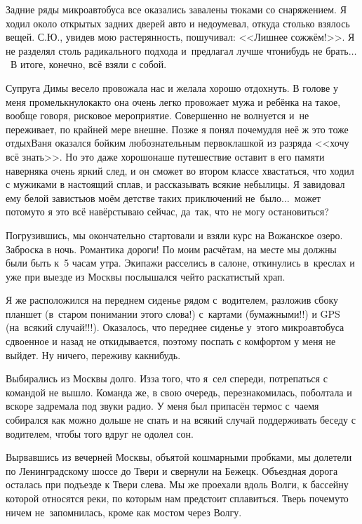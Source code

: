 Задние ряды микроавтобуса все оказались завалены тюками со снаряжением. Я ходил около открытых задних дверей авто и недоумевал, откуда столько взялось вещей. С.Ю., увидев мою растерянность, пошучивал: <<Лишнее сожжём!>>. Я не разделял столь радикального подхода и~предлагал лучше что\sdash нибудь не брать$\ldots$~В итоге, конечно, всё взяли с собой.

Супруга Димы весело провожала нас и желала хорошо отдохнуть. В голове у меня промелькнуло\mdash как\sdash то она очень легко провожает мужа и ребёнка на такое, вообще говоря, рисковое мероприятие. Совершенно не волнуется и~не переживает, по крайней мере внешне. Позже я понял почему\mdash для неё ж это тоже отдых\mdash Ваня оказался бойким любознательным первоклашкой из разряда <<хочу всё знать>>. Но это даже хорошо\mdash наше путешествие оставит в его памяти наверняка очень яркий след, и он сможет во втором классе хвастаться, что ходил с мужиками в настоящий сплав, и рассказывать всякие небылицы. Я завидовал ему белой завистью\mdash в моём детстве таких приключений не~было$\ldots$~может потому\sdash то я это всё навёрстываю сейчас, да~так, что не могу остановиться?

Погрузившись, мы окончательно стартовали и взяли курс на Вожанское озеро. Заброска в ночь. Романтика дороги! По моим расчётам, на месте мы должны были быть к~5\thinspace\nbdash{} часам утра. Экипажи расселись в салоне, откинулись в~креслах и уже при выезде из Москвы послышался чей\sdash то раскатистый храп.

Я же расположился на переднем сиденье рядом с~водителем, разложив сбоку планшет (в~старом понимании этого слова!) с~картами (бумажными!!) и GPS (на~всякий случай!!!). Оказалось, что переднее сиденье у~этого микроавтобуса сдвоенное и назад не откидывается, поэтому поспать с комфортом у меня не выйдет. Ну ничего, переживу как\sdash нибудь. 

Выбирались из Москвы долго. Из\sdash за того, что я~сел спереди, потрепаться с командой не вышло. Команда же, в свою очередь, перезнакомилась, поболтала и вскоре задремала под звуки радио. У меня был припасён термос с~чаем\mdash я собирался как можно дольше не спать и на всякий случай поддерживать беседу с водителем, чтобы того вдруг не одолел сон. 

Вырвавшись из вечерней Москвы, объятой кошмарными пробками, мы долетели по Ленинградскому шоссе до Твери и свернули на Бежецк. Объездная дорога осталась при подъезде к Твери слева. Мы же проехали вдоль Волги, к бассейну которой относятся реки, по которым нам предстоит сплавиться. Тверь почему\sdash то ничем не~запомнилась, кроме как мостом через Волгу. 

